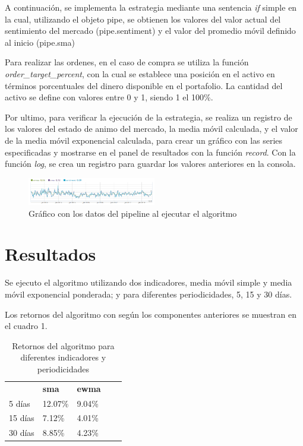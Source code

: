 \documentclass[a4paper, 11pt, twocolumn]{article}
\begin{document}
A continuación, se implementa la estrategia mediante una sentencia \textit{if} simple en la cual, utilizando el objeto pipe, se obtienen los valores del valor actual del sentimiento del mercado (pipe.sentiment) y el valor del promedio móvil definido al inicio (pipe.sma)

Para realizar las ordenes, en el caso de compra se utiliza la función \textit{order\_target\_percent}, con la cual se establece una posición en el activo en términos porcentuales del dinero disponible en el portafolio. La cantidad del activo se define con valores entre 0 y 1, siendo 1 el 100\%.

Por ultimo, para verificar la ejecución de la estrategia, se realiza un registro de los valores del estado de animo del mercado, la media móvil calculada, y el valor de la media móvil exponencial calculada, para crear un gráfico con las series especificadas y mostrarse en el panel de resultados con la función \textit{record}. Con la función \textit{log}, se crea un registro para guardar los valores anteriores en la consola.

\begin{figure}[ht]
\centering
\includegraphics[width=0.5\textwidth]{record.png}
\caption{\label{fig:sol_iter}Gráfico con los datos del pipeline al ejecutar el algoritmo}
\end{figure}

\section{Resultados}

Se ejecuto el algoritmo utilizando dos indicadores, media móvil simple y media móvil exponencial ponderada; y para diferentes periodicidades, 5, 15 y 30 días.

Los retornos del algoritmo con según los componentes anteriores se muestran en el cuadro 1.

\begin{table}[ht]
\centering
\label{table}
\begin{tabular}{|l|l|l|ll}
\cline{1-3}
        & \textbf{sma} & \textbf{ewma} &  &  \\ \cline{1-3}
5 días  & 12.07\%   & 9.04\%    &  &  \\ \cline{1-3}
15 días & 7.12\%   & 4.01\%    &  &  \\ \cline{1-3}
30 días & 8.85\%   & 4.23\%    &  &  \\ \cline{1-3}
\end{tabular}
\caption{Retornos del algoritmo para diferentes indicadores y periodicidades}
\end{table}
\end{document}
